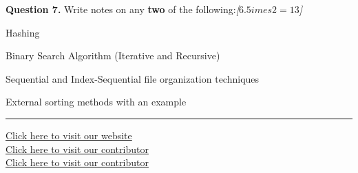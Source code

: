 \documentclass[11pt,a4paper]{article}
\newcommand{\pts}[1]{\hfill   \textit{[#1]}}
\begin{document}
\noindent   \textbf{Question 7.} Write notes on any   \textbf{two} of the following:\pts{$6.5 imes2=13$}

\begin{parts}
  \item Hashing
  \item Binary Search Algorithm (Iterative and Recursive)
  \item Sequential and Index-Sequential file organization techniques
  \item External sorting methods with an example
\end{parts}

\vfill
\rule{\linewidth}{0.4pt}

\begin{center}\small
\href{https://bhu-exam.vercel.app/}{Click here to visit our website}\\[4pt]\href{https://me-aryan.vercel.app/}{Click here to visit our contributor}\\[4pt]\href{https://quashan-me.vercel.app/}{Click here to visit our contributor}
\end{center}
\end{document}
